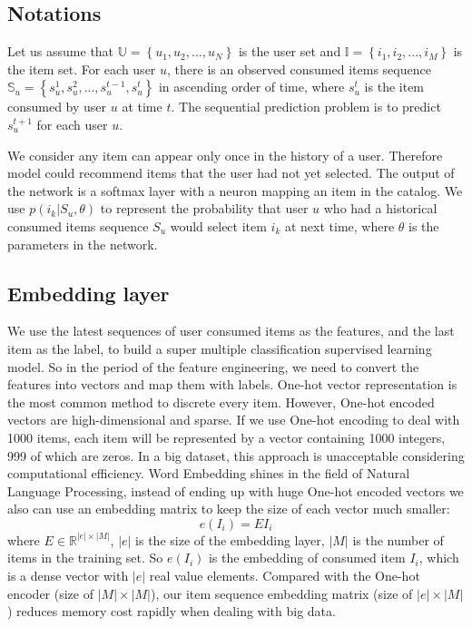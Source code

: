 \documentclass[runningheads]{llncs}
\begin{document}
\subsection{Notations }\label{AA}
Let us assume that $\mathbb{U}= \left \{ u_{1},u_{2},...,u_{N} \right \}\label{eq}$ is the user set and $\mathbb{I}= \left \{ i_{1},i_{2},...,i_{M} \right \}$ is the item set. For each user $u$, there is an observed consumed items sequence $\mathbb{S}_{u}=\left \{ s_{u}^{1},s_{u}^{2},...,s_{u}^{t-1},s_{u}^{t} \right \}$ in ascending order of time, where $s_{u}^{t}$ is the item consumed by user $u$ at time $t$. The sequential prediction problem is to predict $s_{u}^{t+1}$ for each user $u$.

We consider any item can appear only once in the history of a user. Therefore model could recommend items that the user had not yet selected. The output of the network is a softmax layer with a neuron mapping an item in the catalog. We use $p(i_{k}|S_{u},\theta )$ to represent the probability that user $u$ who had a historical consumed items sequence $S_{u}$ would select item $i_{k}$ at next time, where $\theta$ is the parameters in the network.

\subsection{Embedding layer}
 We use the latest sequences of user consumed items as the features, and the last item as the label, to build a super multiple classification supervised learning model. So in the period of the feature engineering, we need to convert the features into vectors and map them with labels. One-hot vector representation is the most common method to discrete every item. However, One-hot encoded vectors are high-dimensional and sparse. If we use One-hot encoding to deal with 1000 items, each item will be represented by a vector containing 1000 integers, 999 of which are zeros. In a big dataset, this approach is unacceptable considering computational efficiency. Word Embedding shines in the field of Natural Language Processing, instead of ending up with huge One-hot encoded vectors we also can use an embedding matrix to keep the size of each vector much smaller:
 \begin{equation}
e(I_{i})=EI_{i}
\end{equation}
where $E\in \mathbb{R}^{|e|\times |M|}$, $|e|$ is the size of the embedding layer, $|M|$ is the number of items in the training set. So $e(I_{i})$ is the embedding of consumed item $I_{i}$, which is a dense vector with $|e|$ real value elements.
Compared with the One-hot encoder (size of $|M|\times|M|$), our item sequence embedding matrix (size of $|e|\times|M|$) reduces memory cost rapidly when dealing with big data.
\end{document}
